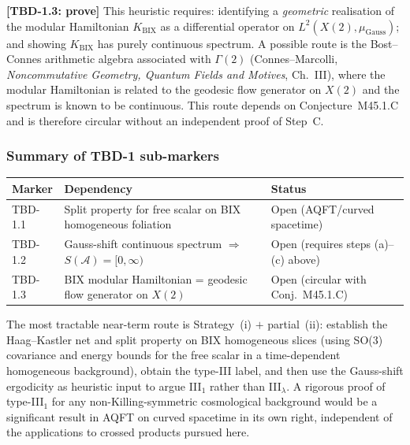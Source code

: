 \noindent\textbf{[TBD-1.3: prove]} This heuristic requires:
identifying a \emph{geometric} realisation of the modular Hamiltonian
$K_{\mathrm{BIX}}$ as a differential operator on
$L^2(X(2),\mu_{\mathrm{Gauss}})$;
and showing $K_{\mathrm{BIX}}$ has purely continuous spectrum.
A possible route is the Bost--Connes arithmetic algebra associated with
$\Gamma(2)$ (Connes--Marcolli, \emph{Noncommutative Geometry, Quantum
Fields and Motives}, Ch.~III), where the modular Hamiltonian is related
to the geodesic flow generator on $X(2)$ and the spectrum is known to be
continuous.
This route depends on Conjecture~M45.1.C and is therefore circular
without an independent proof of Step~C.

\subsubsection*{Summary of TBD-1 sub-markers}

\begin{center}
\small
\begin{tabular}{lll}
\toprule
Marker & Dependency & Status \\
\midrule
TBD-1.1 & Split property for free scalar on BIX homogeneous foliation
        & Open (AQFT/curved spacetime) \\
TBD-1.2 & Gauss-shift continuous spectrum $\Rightarrow$ $S(\mathcal{A})=[0,\infty)$
        & Open (requires steps (a)--(c) above) \\
TBD-1.3 & BIX modular Hamiltonian = geodesic flow generator on $X(2)$
        & Open (circular with Conj.~M45.1.C) \\
\bottomrule
\end{tabular}
\end{center}

\noindent The most tractable near-term route is
Strategy~(i) $+$ partial~(ii):
establish the Haag--Kastler net and split property on BIX homogeneous
slices (using SO(3) covariance and energy bounds for the free scalar
in a time-dependent homogeneous background), obtain the type-III label,
and then use the Gauss-shift ergodicity as heuristic input to argue
III$_1$ rather than III$_\lambda$.
A rigorous proof of type-III$_1$ for any non-Killing-symmetric cosmological
background would be a significant result in AQFT on curved spacetime
in its own right, independent of the applications to crossed products
pursued here.
